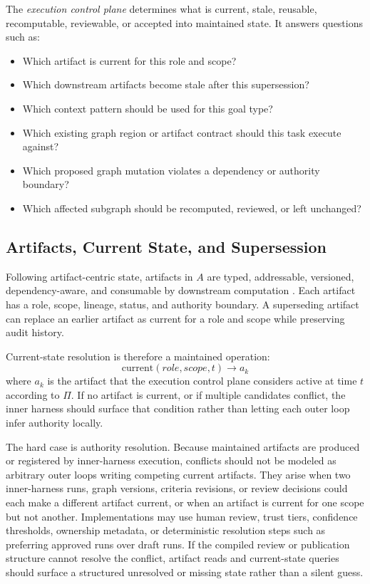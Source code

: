 \documentclass{article}
\begin{document}
The \emph{execution control plane} determines what is current, stale, reusable, recomputable, reviewable, or accepted into maintained state. It answers questions such as:
\begin{itemize}[leftmargin=*]
\item Which artifact is current for this role and scope?
\item Which downstream artifacts become stale after this supersession?
\item Which context pattern should be used for this goal type?
\item Which existing graph region or artifact contract should this task execute against?
\item Which proposed graph mutation violates a dependency or authority boundary?
\item Which affected subgraph should be recomputed, reviewed, or left unchanged?
\end{itemize}

\subsection{Artifacts, Current State, and Supersession}

Following artifact-centric state, artifacts in $A$ are typed, addressable, versioned, dependency-aware, and consumable by downstream computation \cite{rosen2026artifacts}. Each artifact has a role, scope, lineage, status, and authority boundary. A superseding artifact can replace an earlier artifact as current for a role and scope while preserving audit history.

Current-state resolution is therefore a maintained operation:
\begin{equation}
\mathrm{current}(role, scope, t) \rightarrow a_k
\end{equation}
where $a_k$ is the artifact that the execution control plane considers active at time $t$ according to $\Pi$. If no artifact is current, or if multiple candidates conflict, the inner harness should surface that condition rather than letting each outer loop infer authority locally.

The hard case is authority resolution. Because maintained artifacts are produced or registered by inner-harness execution, conflicts should not be modeled as arbitrary outer loops writing competing current artifacts. They arise when two inner-harness runs, graph versions, criteria revisions, or review decisions could each make a different artifact current, or when an artifact is current for one scope but not another. Implementations may use human review, trust tiers, confidence thresholds, ownership metadata, or deterministic resolution steps such as preferring approved runs over draft runs. If the compiled review or publication structure cannot resolve the conflict, artifact reads and current-state queries should surface a structured unresolved or missing state rather than a silent guess.
\end{document}
